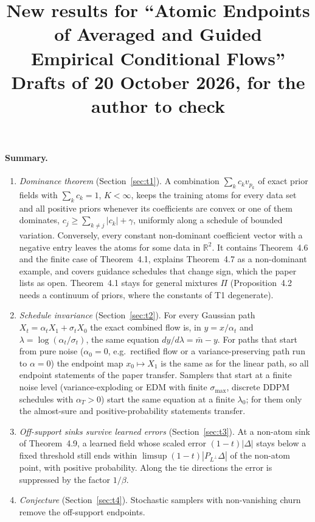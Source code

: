 \documentclass[11pt]{article}
\title{New results for ``Atomic Endpoints of Averaged and Guided\\ Empirical Conditional Flows''\\[2pt]
\large Drafts of 20 October 2026, for the author to check}
\date{}
\theoremstyle{definition}
\theoremstyle{remark}
\newcommand{\R}{\mathbb R}
\begin{document}
\maketitle

\paragraph{Summary.}
\begin{enumerate}[label=T\arabic*.,leftmargin=2.5em]
\item \emph{Dominance theorem} (Section~\ref{sec:t1}). A combination $\sum_kc_kv_{p_k}$ of exact prior
  fields with $\sum_kc_k=1$, $K<\infty$, keeps the training atoms for every data set and all positive
  priors whenever its coefficients are convex or one of them dominates,
  $c_j\ge\sum_{k\ne j}|c_k|+\gamma$, uniformly along a schedule of bounded variation. Conversely, every
  constant non-dominant coefficient vector with a negative entry leaves the atoms for some data in
  $\R^2$. It contains Theorem~4.6 and the finite case of Theorem~4.1, explains Theorem~4.7 as a
  non-dominant example, and covers guidance schedules that change sign, which the paper lists as
  open. Theorem~4.1 stays for general mixtures $\Pi$ (Proposition~4.2 needs a continuum of priors,
  where the constants of T1 degenerate).
\item \emph{Schedule invariance} (Section~\ref{sec:t2}). For every Gaussian path
  $X_t=\alpha_tX_1+\sigma_tX_0$ the exact combined flow is, in $y=x/\alpha_t$ and
  $\lambda=\log(\alpha_t/\sigma_t)$, the same equation $dy/d\lambda=\bar m-y$. For paths that start from
  pure noise ($\alpha_0=0$, e.g.\ rectified flow or a variance-preserving path run to $\alpha=0$) the
  endpoint map $x_0\mapsto X_1$ is the same as for the linear path, so all endpoint statements of the
  paper transfer. Samplers that start at a finite noise level (variance-exploding or EDM with finite
  $\sigma_{\max}$, discrete DDPM schedules with $\alpha_T>0$) start the same equation at a finite
  $\lambda_0$; for them only the almost-sure and positive-probability statements transfer.
\item \emph{Off-support sinks survive learned errors} (Section~\ref{sec:t3}). At a non-atom sink of
  Theorem~4.9, a learned field whose scaled error $(1-t)|\Delta|$ stays below a fixed threshold
  still ends within $\limsup(1-t)|P_{L^\perp}\Delta|$ of the non-atom point, with positive
  probability. Along the tie directions the error is suppressed by the factor $1/\beta$.
\item \emph{Conjecture} (Section~\ref{sec:t4}). Stochastic samplers with non-vanishing churn remove
  the off-support endpoints.
\end{enumerate}
\end{document}

